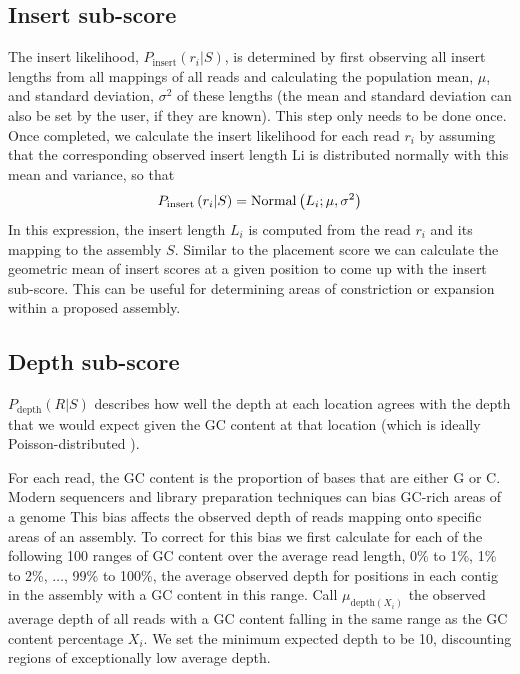 \documentclass[phd,tocprelim]{cornell}
\begin{document}
\subsection{Insert sub-score} %
\label{sub:Insert sub-score}

The insert likelihood, $P_{\text{insert}}\left(r_{i}|S\right)$, is determined by first observing all insert lengths from all mappings of all reads and calculating the population mean, $\mu$, and standard deviation, $\sigma^{2}$ of these lengths (the mean and standard deviation can also be set by the user, if they are known). This step only needs to be done once.  Once completed, we calculate the insert likelihood for each read $r_{i}$ by assuming that the corresponding observed insert length Li is distributed normally with this mean and variance, so that
\begin{equation}
    P_{\text{insert}}\left(r_{i}|S\right) = {\rm Normal}\left(L_{i};\mu,\sigma^{2}\right)
\end{equation}
In this expression, the insert length $L_{i}$ is computed from the read $r_{i}$ and its mapping to the assembly $S$. Similar to the placement score we can calculate the geometric mean of insert scores at a given position to come up with the insert sub-score. This can be useful for determining areas of constriction or expansion within a proposed assembly.


\subsection{Depth sub-score} %
\label{sub:Depth sub-score}

$P_{\text{depth}}(R|S)$ describes how well the depth at each location agrees with the depth that we would expect given the GC content at that location (which is ideally Poisson-distributed \cite{Lander1988}).

For each read, the GC content is the proportion of bases that are either G or C. Modern sequencers and library preparation techniques can bias GC-rich areas of a genome \cite{Aird2011} This bias affects the observed depth of reads mapping onto specific areas of an assembly. To correct for this bias we first calculate for each of the following 100 ranges of GC content over the average read length, 0\% to 1\%, 1\% to 2\%, $\ldots$, 99\% to 100\%, the average observed depth for positions in each contig in the assembly with a GC content in this range. Call $\mu_{\text{depth}(X_{i})}$ the observed average depth of all reads with a GC content falling in the same range as the GC content percentage $X_{i}$. We set the minimum expected depth to be 10, discounting regions of exceptionally low average depth.
\end{document}
